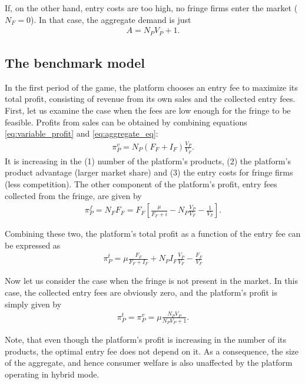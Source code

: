 \documentclass[a4paper]{article}
\begin{document}
If, on the other hand, entry costs are too high, no fringe firms enter the market ($N_F = 0$).
In that case, the aggregate demand is just
\begin{align*}
    A = N_P V_P + 1.
\end{align*}

\subsection{The benchmark model}

In the first period of the game, the platform chooses an entry fee to maximize its total profit, consisting of revenue from its own sales and the collected entry fees.
First, let us examine the case when the fees are low enough for the fringe to be feasible.
Profits from sales can be obtained by combining equations \eqref{eq:variable_profit} and \eqref{eq:aggregate_eq}:
\begin{align*}
    \pi_P^{v} = N_P (F_F + I_F) \frac{V_P}{V_F}.
\end{align*}
It is increasing in the (1) number of the platform's products, (2) the platform's product advantage (larger market share) and (3) the entry costs for fringe firms (less competition).
The other component of the platform's profit, entry fees collected from the fringe, are given by
\begin{align*}
    \pi_P^{f} = N_F F_F = F_F \left[ \frac{\mu}{F_F + i} - N_P \frac{V_P}{V_F} - \frac{1}{V_F} \right].
\end{align*}

Combining these two, the platform's total profit as a function of the entry fee can be expressed as
\begin{align*}
    \pi_P^{t} = \mu\frac{F_F}{F_F + I_F} + N_P I_F \frac{V_P}{V_F} - \frac{F_F}{V_F}
\end{align*}

Now let us consider the case when the fringe is not present in the market.
In this case, the collected entry fees are obviously zero, and the platform's profit is simply given by
\begin{align*}
    \pi_P^{t} = \pi_P^{v} = \mu \frac{ N_P V_P}{N_P V_P + 1}.
\end{align*}

Note, that even though the platform's profit is increasing in the number of its products, the optimal entry fee does not depend on it.
As a consequence, the size of the aggregate, and hence consumer welfare is also unaffected by the platform operating in hybrid mode.
\end{document}
